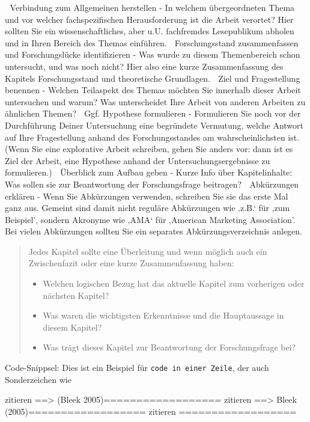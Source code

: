 	Verbindung zum Allgemeinen herstellen - In welchem übergeordneten Thema und vor welcher fachspezifischen Herausforderung ist die Arbeit verortet? Hier sollten Sie ein wissenschaftliches, aber u.U. fachfremdes Lesepublikum abholen und in Ihren Bereich des Themas einführen.
	Forschungsstand zusammenfassen und Forschungslücke identifizieren - Was wurde zu diesem Themenbereich schon untersucht, und was noch nicht? Hier also eine kurze Zusammenfassung des Kapitels Forschungsstand und theoretische Grundlagen. 
	Ziel und Fragestellung benennen - Welchen Teilaspekt des Themas möchten Sie innerhalb dieser Arbeit untersuchen und warum? Was unterscheidet Ihre Arbeit von anderen Arbeiten zu ähnlichen Themen? 
	Ggf. Hypothese formulieren - Formulieren Sie noch vor der Durchführung Deiner Untersuchung eine begründete Vermutung, welche Antwort auf Ihre Fragestellung anhand des Forschungsstandes am wahrscheinlichsten ist. (Wenn Sie eine explorative Arbeit schreiben, gehen Sie anders vor: dann ist es Ziel der Arbeit, eine Hypothese anhand der Untersuchungsergebnisse zu formulieren.) 
	Überblick zum Aufbau geben - Kurze Info über Kapitelinhalte: Was sollen sie zur Beantwortung der Forschungsfrage beitragen?
	Abkürzungen erklären - Wenn Sie Abkürzungen verwenden, schreiben Sie sie das erste Mal ganz aus. Gemeint sind damit nicht reguläre Abkürzungen wie ‚z.B.‘ für ‚zum Beispiel’, sondern Akronyme wie ‚AMA‘ für ‚American Marketing Association’. Bei vielen Abkürzungen sollten Sie ein separates Abkürzungsverzeichnis anlegen.


\begin{abstract}
Jedes Kapitel sollte eine Überleitung und wenn möglich auch ein Zwischenfazit oder eine kurze Zusammenfassung haben: 
\begin{itemize}
    \item Welchen logischen Bezug hat das aktuelle Kapitel zum vorherigen oder nächsten Kapitel?
    \item Was waren die wichtigsten Erkenntnisse und die Hauptaussage in diesem Kapitel?
    \item Was trägt dieses Kapitel zur Beantwortung der Forschungsfrage bei?
\end{itemize}
\end{abstract}


Code-Snippsel:
Dies ist ein Beispiel für \Verb|code in einer Zeile|, der auch Sonderzeichen wie

zitieren \citep{Bleek.2005} ==> (Bleek 2005)==================
zitieren \citet{Bleek.2005} ==> Bleek (2005)==================
zitieren \citep[S.~373]{Lange.2020} ==================